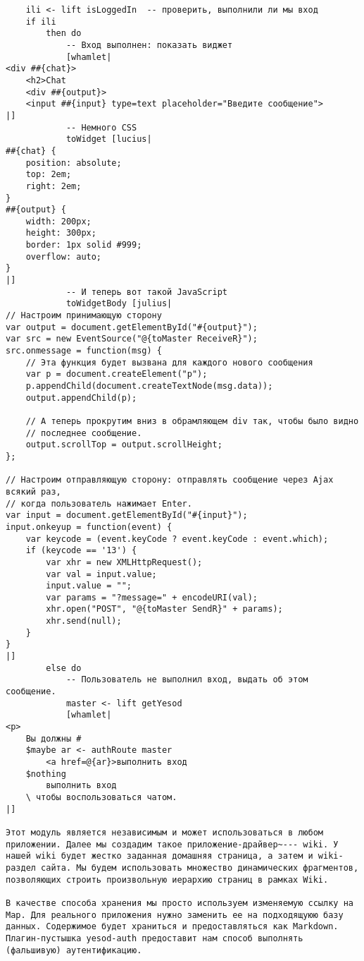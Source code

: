\begin{lstlisting}
    ili <- lift isLoggedIn  -- проверить, выполнили ли мы вход
    if ili
        then do
            -- Вход выполнен: показать виджет
            [whamlet|
<div ##{chat}>
    <h2>Chat
    <div ##{output}>
    <input ##{input} type=text placeholder="Введите сообщение">
|]
            -- Немного CSS
            toWidget [lucius|
##{chat} {
    position: absolute;
    top: 2em;
    right: 2em;
}
##{output} {
    width: 200px;
    height: 300px;
    border: 1px solid #999;
    overflow: auto;
}
|]
            -- И теперь вот такой JavaScript
            toWidgetBody [julius|
// Настроим принимающую сторону
var output = document.getElementById("#{output}");
var src = new EventSource("@{toMaster ReceiveR}");
src.onmessage = function(msg) {
    // Эта функция будет вызвана для каждого нового сообщения
    var p = document.createElement("p");
    p.appendChild(document.createTextNode(msg.data));
    output.appendChild(p);

    // А теперь прокрутим вниз в обрамляющем div так, чтобы было видно
    // последнее сообщение.
    output.scrollTop = output.scrollHeight;
};

// Настроим отправляющую сторону: отправлять сообщение через Ajax всякий раз,
// когда пользователь нажимает Enter.
var input = document.getElementById("#{input}");
input.onkeyup = function(event) {
    var keycode = (event.keyCode ? event.keyCode : event.which);
    if (keycode == '13') {
        var xhr = new XMLHttpRequest();
        var val = input.value;
        input.value = "";
        var params = "?message=" + encodeURI(val);
        xhr.open("POST", "@{toMaster SendR}" + params);
        xhr.send(null);
    }
}
|]
        else do
            -- Пользователь не выполнил вход, выдать об этом сообщение.
            master <- lift getYesod
            [whamlet|
<p>
    Вы должны #
    $maybe ar <- authRoute master
        <a href=@{ar}>выполнить вход
    $nothing
        выполнить вход
    \ чтобы воспользоваться чатом.
|]

Этот модуль является независимым и может использоваться в любом приложении. Далее мы создадим такое приложение-драйвер~--- wiki. У нашей wiki будет жестко заданная домашняя страница, а затем и wiki-раздел сайта. Мы будем использовать множество динамических фрагментов, позволяющих строить произвольную иерархию страниц в рамках Wiki.

В качестве способа хранения мы просто используем изменяемую ссылку на Map. Для реального приложения нужно заменить ее на подходящуюю базу данных. Содержимое будет храниться и предоставляться как Markdown. Плагин-пустышка yesod-auth предоставит нам способ выполнять (фальшивую) аутентификацию.


\end{lstlisting}
